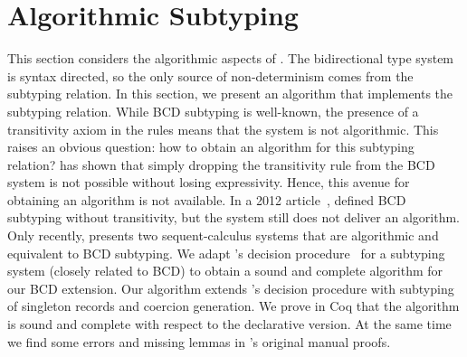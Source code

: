 
\section{Algorithmic Subtyping}
\label{sec:alg}

This section considers the algorithmic aspects of \namee. The bidirectional type
system is syntax directed, so the only source of non-determinism comes from the
subtyping relation. In this section, we present an algorithm that implements the
subtyping relation. While BCD subtyping is well-known, the presence of a
transitivity axiom in the rules means that the system is not algorithmic. This
raises an obvious question: how to obtain an algorithm for this subtyping
relation? \citet{Laurent12note} has shown that simply dropping the transitivity
rule from the BCD system is not possible without losing expressivity. Hence,
this avenue for obtaining an algorithm is not available. In a 2012
article~\citep{laurent2012intersection}, \citeauthor{laurent2012intersection} defined
BCD subtyping without transitivity, but the system still does not deliver an
algorithm. Only recently, \citet{Laurent18b} presents two
sequent-calculus systems that are algorithmic and equivalent to BCD subtyping.
We adapt \citeauthor{pierce1989decision}'s decision
procedure~\citep{pierce1989decision} for a subtyping system (closely
related to BCD) to obtain a sound and complete algorithm for our
BCD extension. Our algorithm extends \citeauthor{pierce1989decision}'s decision
procedure with subtyping of singleton records and
coercion generation. We prove in Coq that the algorithm is sound and complete with
respect to the declarative version. At the same time we
find some errors and missing lemmas in \citeauthor{pierce1989decision}'s original manual proofs.




